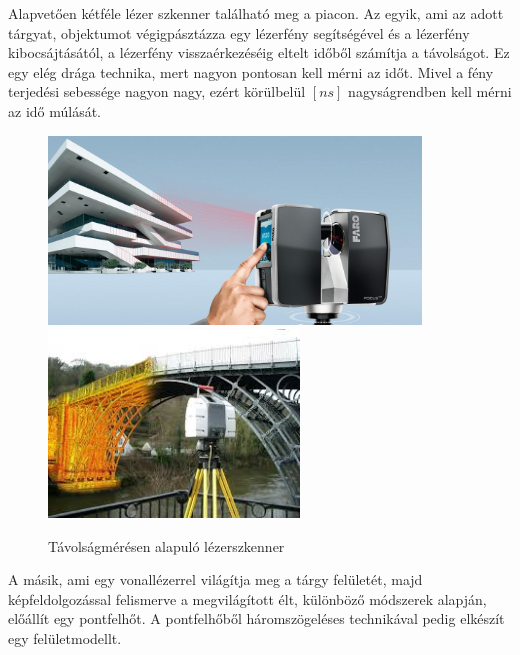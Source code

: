 \documentclass[12pt,a4paper]{article}
\begin{document}
	Alapvetően kétféle lézer szkenner található meg a piacon. Az egyik, ami az adott tárgyat, objektumot végigpásztázza egy lézerfény segítségével és a lézerfény kibocsájtásától, a lézerfény visszaérkezéséig eltelt időből számítja a távolságot. Ez egy elég drága technika, mert nagyon pontosan kell mérni az időt. Mivel a fény terjedési sebessége nagyon nagy, ezért körülbelül $[ns]$ nagyságrendben kell mérni az idő múlását.\\[10pt]
	\begin{figure}[h!]
		\begin{center}
			\includegraphics[height=5cm]{images/Faro_Building_Scan}
			\includegraphics[height=5cm]{images/Bridge_Scan}
		\end{center}
		\caption{Távolságmérésen alapuló lézerszkenner\cite{FaroBuildingScan}\cite{BridgeScan}}
	\end{figure}
	A másik, ami egy vonallézerrel világítja meg a tárgy felületét, majd képfeldolgozással felismerve a megvilágított élt, különböző módszerek alapján, előállít egy pontfelhőt. A pontfelhőből háromszögeléses technikával pedig elkészít egy felületmodellt.\\[10pt]
\end{document}
